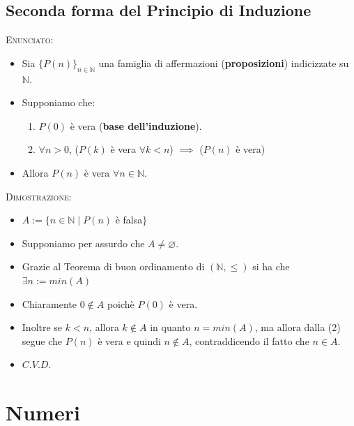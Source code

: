 \documentclass[10pt]{article}
\begin{document}
\subsection{Seconda forma del Principio di Induzione}
\textsc{Enunciato:}
\begin{itemize}
\item
Sia $\displaystyle{\{P(n)\}_{n \in \mathbb{N}}}$ una famiglia di affermazioni (\textbf{proposizioni}) indicizzate su $\mathbb{N}$.
\item
Supponiamo che:
\begin{enumerate}
\item
$P(0)$ è vera (\textbf{base dell'induzione}).
\item
$\forall n > 0$, ($P(k)$ è vera $\forall k < n$) $\implies$ ($P(n)$ è vera)
\end{enumerate}
\item
Allora $P(n)$ è vera $\forall n \!\in\! \mathbb{N}$.
\end{itemize}
\textsc{Dimostrazione:}
\begin{itemize}
\item
$A := \{n \!\in\!\mathbb{N} \;|\; P(n)$ è falsa$\}$
\item
Supponiamo per assurdo che $A \neq \varnothing$.
\item
Grazie al Teorema di buon ordinamento di $(\mathbb{N}, \leq)$ si ha che $\exists n := min(A)$
\item
Chiaramente $0 \not \in A$ poichè $P(0)$ è vera.
\item
Inoltre se $k<n$, allora  $k \not \in A$ in quanto $n= min(A)$, ma allora dalla (2) segue che $P(n)$ è vera e quindi $n \not \in A$, contraddicendo il fatto che $n \in A$.
\item
$C.V.D.$
\end{itemize}
\newpage
\section{Numeri}
\end{document}
